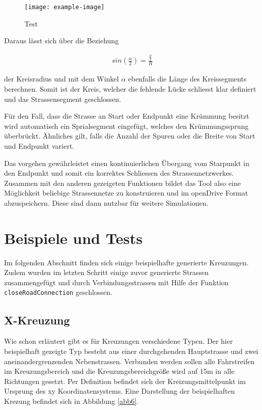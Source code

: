 \begin{figure}[H]
	\flushleft
	\texttt{[image: example-image]}
	\caption{Test}
	\label{abb5}
\end{figure}

Daraus lässt sich über die Beziehung 

\begin{align}
        sin(\frac{\alpha}{2}) = \frac{\frac{d}{2}}{R}
\end{align}

der Kreisradius und mit dem Winkel \(\alpha\) ebenfalls die Länge des Kreissegments berechnen. Somit ist der Kreis, welcher die fehlende Lücke schliesst klar definiert und das Strassensegment geschlossen.

Für den Fall, dass die Strasse an Start oder Endpunkt eine Krümmung besitzt wird automatisch ein Sprialsegment eingefügt, welches den Krümmungssprung überbrückt. Ähnliches gilt, falls die Anzahl der Spuren oder die Breite von Start und Endpunkt variert.

Das vorgehen gewährleistet einen kontinuierlichen Übergang vom Starpunkt in den Endpunkt und somit ein korrektes Schliessen des Strassennetzwerkes. Zusammen mit den anderen gezeigeten Funktionen bildet das Tool also eine Möglichkeit beliebige Strassennetze zu konstruieren und im openDrive Format abzuspeichern. Diese sind dann nutzbar für weitere Simulationen.

\chapter{Beispiele und Tests}

Im folgenden Abschnitt finden sich einige beispielhafte generierte Kreuzungen. Zudem wurden im letzten Schritt einige zuvor generierte Strassen zusammengefügt und durch Verbindungsstrassen mit Hilfe der Funktion \texttt{closeRoadConnection} geschlossen. 

\section{X-Kreuzung}
Wie schon erläutert gibt es für Kreuzungen verschiedene Typen. Der hier beispielhaft gezeigte Typ besteht aus einer durchgehenden Hauptstrasse und zwei aneinandergrenzenden Nebenstrassen. Verbunden werden sollen alle Fahrstreifen im Kreuzungsbereich und die Kreuzungsbereichgröße wird auf 15m in alle Richtungen gesetzt. Per Definition befindet sich der Kreizungsmittelpunkt im Ursprung des xy Koordinatensystems. Eine Darstellung der beispielhaften Krezung befindet sich in Abbildung \ref{abb6}.

